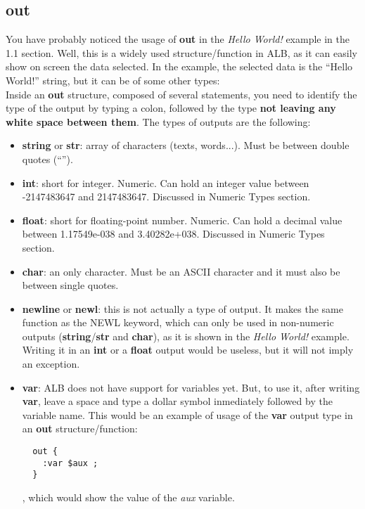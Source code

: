 \documentclass[12pt]{book}
\begin{document}
\subsection{out}
You have probably noticed the usage of \textbf{out} in the \textit{Hello World!} example in the 1.1 section. Well, this is a widely used structure/function in ALB, as it can easily show on screen the data selected. In the example, the selected data is the ``Hello World!'' string, but it can be of some other types:\\
\bigskip
Inside an \textbf{out} structure, composed of several statements, you need to identify the type of the output by typing a colon, followed by the type \textbf{not leaving any white space between them}. The types of outputs are the following:
\begin{itemize}
  \item \textbf{string} or \textbf{str}: array of characters (texts, words...). Must be between double quotes (``'').
  \item \textbf{int}: short for integer. Numeric. Can hold an integer value between -2147483647 and 2147483647. Discussed in Numeric Types section.
  \item \textbf{float}: short for floating-point number. Numeric. Can hold a decimal value between 1.17549e-038 and 3.40282e+038. Discussed in Numeric Types section.
  \item \textbf{char}: an only character. Must be an ASCII character and it must also be between single quotes.
  \item \textbf{newline} or \textbf{newl}: this is not actually a type of output. It makes the same function as the NEWL keyword, which can only be used in non-numeric outputs (\textbf{string}/\textbf{str} and \textbf{char}), as it is shown in the \textit{Hello World!} example. Writing it in an \textbf{int} or a \textbf{float} output would be useless, but it will not imply an exception.
  \item \textbf{var}: ALB does not have support for variables yet. But, to use it, after writing \textbf{var}, leave a space and type a dollar symbol inmediately followed by the variable name.
  This would be an example of usage of the \textbf{var} output type in an \textbf{out} structure/function:
  \begin{lstlisting}
  out {
    :var $aux ;
  }
  \end{lstlisting}
  , which would show the value of the \textit{aux} variable.
\end{itemize}
\end{document}
